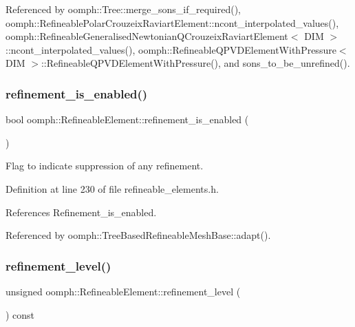 Referenced by oomph\+::\+Tree\+::merge\+\_\+sons\+\_\+if\+\_\+required(), oomph\+::\+Refineable\+Polar\+Crouzeix\+Raviart\+Element\+::ncont\+\_\+interpolated\+\_\+values(), oomph\+::\+Refineable\+Generalised\+Newtonian\+Q\+Crouzeix\+Raviart\+Element$<$ D\+I\+M $>$\+::ncont\+\_\+interpolated\+\_\+values(), oomph\+::\+Refineable\+Q\+P\+V\+D\+Element\+With\+Pressure$<$ D\+I\+M $>$\+::\+Refineable\+Q\+P\+V\+D\+Element\+With\+Pressure(), and sons\+\_\+to\+\_\+be\+\_\+unrefined().

\mbox{\label{classoomph_1_1RefineableElement_a8f5e9e69342ed6258c6f450fec4d0999}} 
\subsubsection{\texorpdfstring{refinement\+\_\+is\+\_\+enabled()}{refinement\_is\_enabled()}}
{\footnotesize\ttfamily bool oomph\+::\+Refineable\+Element\+::refinement\+\_\+is\+\_\+enabled (\begin{DoxyParamCaption}{ }\end{DoxyParamCaption})\hspace{0.3cm}{\ttfamily [inline]}}



Flag to indicate suppression of any refinement. 



Definition at line 230 of file refineable\+\_\+elements.\+h.



References Refinement\+\_\+is\+\_\+enabled.



Referenced by oomph\+::\+Tree\+Based\+Refineable\+Mesh\+Base\+::adapt().

\mbox{\label{classoomph_1_1RefineableElement_a6b9153d7933baf6092febaca278a6fc7}} 
\subsubsection{\texorpdfstring{refinement\+\_\+level()}{refinement\_level()}}
{\footnotesize\ttfamily unsigned oomph\+::\+Refineable\+Element\+::refinement\+\_\+level (\begin{DoxyParamCaption}{ }\end{DoxyParamCaption}) const\hspace{0.3cm}{\ttfamily [inline]}}



